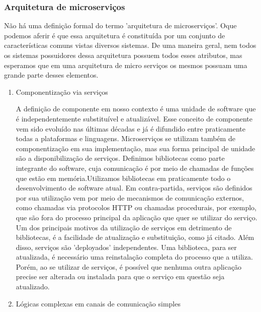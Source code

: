 \subsubsection{Arquitetura de microserviços}\label{sec:LABEL_CHP_4_SEC_B_SEC_A_SEC_C}

Não há uma definição formal do termo 'arquitetura de microserviços'. Oque podemos aferir é que essa arquitetura é constituída por um conjunto de características comuns vistas diversos sistemas. 
De uma maneira geral, nem todos os sistemas possuidores dessa arquitetura possuem todos esses atributos, mas esperamos que em uma arquitetura de micro serviços os mesmos possuam uma grande parte desses elementos.

\begin{enumerate}

\item Componentização via serviços

A definição de componente em nosso contexto é uma unidade de software que é independentemente substituível e atualizável. Esse conceito de componente vem sido evoluído nas últimas décadas e já é difundido entre praticamente todas a plataformas e linguagens.
Microserviços se utilizam também de componentização em sua implementação, mas sua forma principal de unidade são a disponibilização de serviços.
Definimos bibliotecas como parte integrante do software, cuja comunicação é por meio de chamadas de funções que estão em memória.Utilizamos bibliotecas em praticamente todo o desenvolvimento de software atual.
Em contra-partida, serviços são definidos por sua utilização vem por meio de mecanismos de comunicação externos, como chamadas via protocolos HTTP ou chamadas procedurais, por exemplo, que são fora do processo principal da aplicação que quer se utilizar do serviço.
Um dos principais motivos da utilização de serviços em detrimento de bibliotecas, é a facilidade de atualização e substituição, como já citado. Além disso, serviços são 'deployados' independentes.  Uma biblioteca, para ser atualizada, é necessário uma reinstalação completa do processo que a utiliza. Porém, ao se utilizar de serviços, é possível que nenhuma outra aplicação precise ser alterada ou instalada para que o serviço em questão seja atualizado.

\item Lógicas complexas em canais de comunicação simples
	

\end{enumerate}
